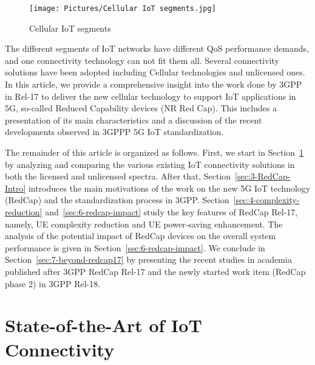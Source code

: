 \documentclass[]{IEEEtran}
\begin{document}
\begin{figure}
\centerline{\texttt{[image: Pictures/Cellular IoT segments.jpg]}}
\caption{Cellular IoT segments~\cite{kuhlins_cellular_2020}}
\label{fig:CIoT_segments}
\end{figure}
{
\justify
The different segments of IoT networks have different QoS performance demands, and one connectivity technology can not fit them all.
}
Several connectivity solutions have been adopted including Cellular technologies and unlicensed ones.
In this article, we provide a comprehensive insight into the work done by 3GPP in Rel-17 to deliver the new cellular technology to support IoT applications in 5G, so-called Reduced Capability devices (NR Red Cap).
This includes a presentation of its main characteristics and a discussion of the recent developments observed in 3GPPP 5G IoT standardization.

The remainder of this article is organized as follows.
First, we start in Section~\ref{sec:2-IoT-Connectivity} by analyzing and comparing the various existing IoT connectivity solutions in both the licensed and unlicensed spectra.
After that, Section~\ref{sec:3-RedCap-Intro} introduces the main motivations of the work on the new 5G IoT technology (RedCap) and the standardization process in 3GPP.
Section~\ref{sec:4-complexity-reduction} and~\ref{sec:6-redcap-impact}  study the key features of RedCap Rel-17, namely, UE complexity reduction and UE power-saving enhancement.
The analysis of the potential impact of RedCap devices on the overall system performance is given in Section~\ref{sec:6-redcap-impact}.
We conclude in Section~\ref{sec:7-beyond-redcap17} by presenting the recent studies in academia published after 3GPP RedCap Rel-17 and the newly started work item (RedCap phase 2) in 3GPP Rel-18.




\section{State-of-the-Art of IoT Connectivity}
\label{sec:2-IoT-Connectivity}

\end{document}
